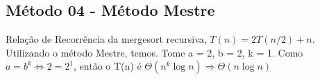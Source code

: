 \subsection{Método 04 - Método Mestre}
Relação de Recorrência da mergesort recursiva, $T(n) = 2T(n/2) + n$. Utilizando o método Mestre, temos.
Tome a = 2, b = 2, k = 1. Como $a = b^k \Leftrightarrow 2 = 2^1$, então o T(n) é $\Theta(n^k \log{n}) \Rightarrow \Theta(n \log{n})$